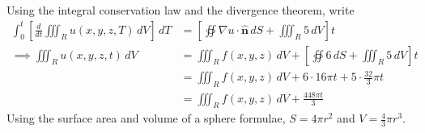 \documentclass[a4paper]{article}
\begin{document}
Using the integral conservation law and the divergence theorem, write
\begin{align*}
	\int^{t}_{0} \!\left[ \frac{d }{d t}\iiint_{R} u \!\left( x,y,z,T \right) \, dV \right] \, dT & = \!\left[ \oiint \nabla u \cdot \pmb{\hat{n}} \, dS + \iiint_{R} 5 \, dV \right]t \\
	\implies \iiint_{R} u \!\left( x,y,z,t \right) \, dV & = \iiint_{R} f \!\left( x,y,z \right) \, dV + \!\left[ \oiint 6 \, dS + \iiint_{R} 5 \, dV \right]t \\
								    & = \iiint_{R} f \!\left( x,y,z \right) \, dV + 6 \cdot 16 \pi t + 5 \cdot \frac{32}{3}\pi t \\
								    & = \iiint_{R} f \!\left( x,y,z \right) \, dV + \frac{448 \pi t}{3}
\end{align*}
Using the surface area and volume of a sphere formulae, \( S = 4 \pi r^{2} \) and \( V = \frac{4}{3}\pi r^{3} \).
\end{document}
